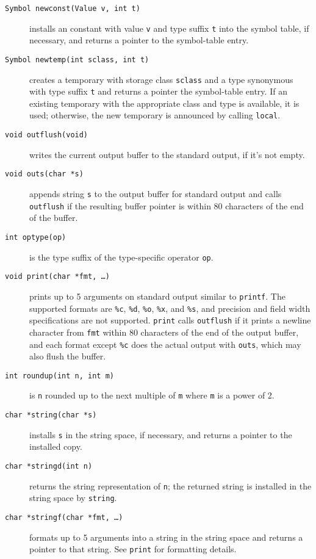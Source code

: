 \begin{description}
\item[{\tt Symbol newconst(Value v, int t)}] installs an constant with value \verb|v|
and type suffix \verb|t| into the symbol table, if necessary,
and returns a pointer to the symbol-table entry.

\item[{\tt Symbol newtemp(int sclass, int t)}] creates a temporary
with storage class \verb|sclass| and a type synonymous with type suffix \verb|t|
and returns a pointer the symbol-table entry.
If an existing temporary with the appropriate class and type is available,
it is used; otherwise, the new temporary is announced by calling \verb|local|.

\item[{\tt void outflush(void)}] writes the current output buffer
to the standard output, if it's not empty.

\item[{\tt void outs(char *s)}] appends string \verb|s| to the output buffer
for standard output and calls \verb|outflush|
if the resulting buffer pointer is within 80 characters
of the end of the buffer.

\item[{\tt int optype(op)}] is the type suffix of the type-specific operator \verb|op|.

\item[{\tt void print(char *fmt, \ldots)}] prints up to 5 arguments on standard output
similar to \verb|printf|. The supported formats are
\verb|%c|, \verb|%d|, \verb|%o|, \verb|%x|, and \verb|%s|, 
and precision and field width specifications are not supported.
\verb|print| calls \verb|outflush| if it prints a newline character from
\verb|fmt| within 80 characters of the end of the output buffer,
and each format except \verb|%c| does the actual output
with \verb|outs|, which may also flush the buffer.

\item[{\tt int roundup(int n, int m)}] is \verb|n| rounded up to the
next multiple of \verb|m| where \verb|m| is a power of 2.

\item[{\tt char *string(char *s)}] installs \verb|s| in the string space,
if necessary, and returns a pointer to the installed copy.

\item[{\tt char *stringd(int n)}] returns the string representation of \verb|n|;
the returned string is installed in the string space by \verb|string|.

\item[{\tt char *stringf(char *fmt, \ldots)}] formats up to 5 arguments
into a string in the string space and returns a pointer to that string.
See \verb|print| for formatting details.


\end{description}
